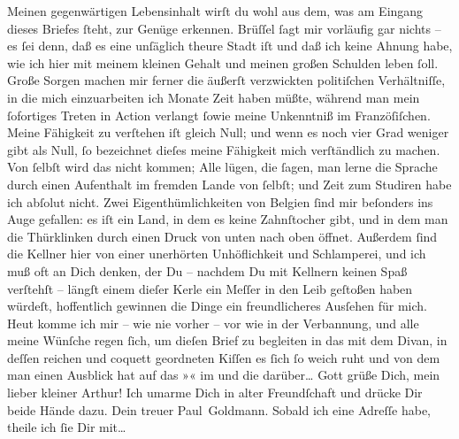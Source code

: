 \pstart
           Meinen gegenwärtigen Lebensinhalt wirſt du wohl aus dem, was am Eingang dieses
               Briefes ſteht, zur Genüge erkennen. Brüſſel ſagt
               mir vorläufig gar nichts – es ſei denn, daß es eine unſäglich theure Stadt iſt und daß ich keine Ahnung habe, wie
               ich hier mit meinem kleinen Gehalt und meinen großen Schulden leben ſoll. Große
               Sorgen machen mir ferner die äußerſt verzwickten politiſchen Verhältniſſe, in die
               mich einzuarbeiten ich Monate Zeit haben müßte, während man {\pb}mein ſofortiges Treten in Action verlangt ſowie
               meine Unkenntniß im Franzöſiſchen. Meine Fähigkeit zu verſtehen iſt gleich Null; und
               wenn es noch vier Grad weniger gibt als Null, ſo bezeichnet dieſes meine Fähigkeit
               mich verſtändlich zu machen. Von ſelbſt wird das nicht kommen; Alle lügen, die ſagen,
               man lerne die Sprache durch einen Aufenthalt im fremden Lande von ſelbſt; und Zeit
               zum Studiren habe ich abſolut nicht. Zwei Eigenthümlichkeiten von Belgien ſind mir beſonders ins Auge gefallen: es iſt ein Land, in dem es keine
               Zahnſtocher gibt, und in dem man die Thürklinken durch einen Druck von unten nach
               oben öffnet. Außerdem ſind die Kellner hier von einer unerhörten Unhöflichkeit und
               Schlamperei, und ich muß oft an Dich denken, der Du – nachdem Du mit Kellnern keinen
               Spaß verſtehſt – längſt einem dieſer Kerle ein Meſſer in den Leib geſtoßen haben
               würdeſt, hoffentlich gewinnen die Dinge ein freundlicheres Ausſehen für mich. Heut komme ich mir – wie nie vorher – vor wie in der
               Verbannung, und alle meine Wünſche regen ſich, um dieſen Brief zu begleiten in das
                  \label{K_L02663-7v}\label{K_L02663-7} mit dem Divan, in deſſen reichen und coquett geordneten Kiſſen es
               ſich ſo weich ruht und von dem man einen Ausblick hat auf das »\label{K_L02663-8v}\label{K_L02663-8}« im \label{K_L02663-9v}\label{K_L02663-9} und die \label{K_L02663-10v}\label{K_L02663-10} darüber{\dots} Gott grüße Dich,
               mein lieber kleiner Arthur! Ich umarme Dich in alter Freundſchaft und drücke Dir
               beide Hände dazu.\pend
           \pstart Dein treuer \spacefill\mbox{Paul Goldmann.}\pend{}
\pstart
           \noindent{}Sobald ich eine Adreſſe habe, theile ich ſie Dir mit{\dots}\pend
           
